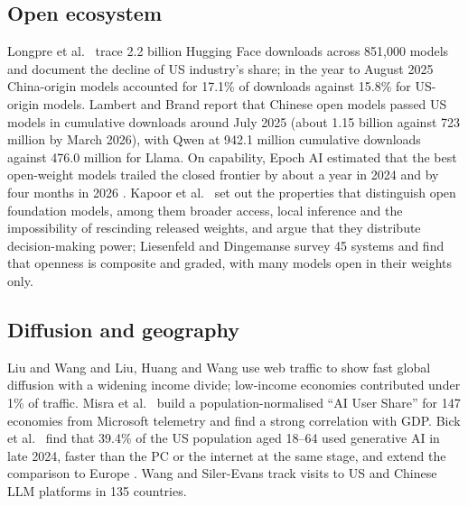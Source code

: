 \documentclass[11pt]{article}
\begin{document}
\subsection{Open ecosystem} Longpre et al.\ \cite{longpre2025economies} trace 2.2 billion Hugging Face downloads across 851{,}000 models and document the decline of US industry's share; in the year to August 2025 China-origin models accounted for 17.1\% of downloads against 15.8\% for US-origin models. Lambert and Brand \cite{lambert2026atom} report that Chinese open models passed US models in cumulative downloads around July 2025 (about 1.15 billion against 723 million by March 2026), with Qwen at 942.1 million cumulative downloads against 476.0 million for Llama. On capability, Epoch AI estimated that the best open-weight models trailed the closed frontier by about a year in 2024 \cite{cottier2024far} and by four months in 2026 \cite{epoch2026gap}. Kapoor et al.\ \cite{kapoor2024societal} set out the properties that distinguish open foundation models, among them broader access, local inference and the impossibility of rescinding released weights, and argue that they distribute decision-making power; Liesenfeld and Dingemanse \cite{liesenfeld2024rethinking} survey 45 systems and find that openness is composite and graded, with many models open in their weights only.

\subsection{Diffusion and geography} Liu and Wang \cite{liu2024who} and Liu, Huang and Wang \cite{liu2025who} use web traffic to show fast global diffusion with a widening income divide; low-income economies contributed under 1\% of traffic. Misra et al.\ \cite{misra2025measuring} build a population-normalised ``AI User Share'' for 147 economies from Microsoft telemetry and find a strong correlation with GDP. Bick et al.\ \cite{bick2024rapid} find that 39.4\% of the US population aged 18--64 used generative AI in late 2024, faster than the PC or the internet at the same stage, and extend the comparison to Europe \cite{bick2026mind}. Wang and Siler-Evans \cite{wang2026uschina} track visits to US and Chinese LLM platforms in 135 countries.
\end{document}
